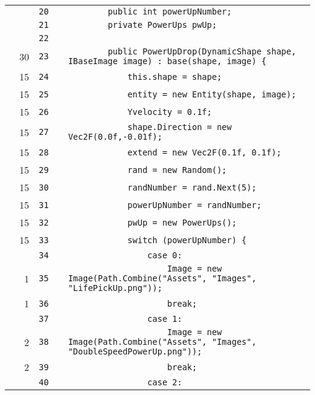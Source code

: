 \documentclass[a4paper,landscape,10pt]{article}
\begin{document}
\begin{longtable}[l]{lrrll}
\cellcolor{gray} &  & \verb~20~ & & \verb~        public int powerUpNumber;~\\
\cellcolor{gray} &  & \verb~21~ & & \verb~        private PowerUps pwUp;~\\
\cellcolor{gray} &  & \verb~22~ & & \verb~~\\
\cellcolor{green} & 30 & \verb~23~ & & \verb~        public PowerUpDrop(DynamicShape shape, IBaseImage image) : base(shape, image) {~\\
\cellcolor{green} & 15 & \verb~24~ & & \verb~            this.shape = shape;~\\
\cellcolor{green} & 15 & \verb~25~ & & \verb~            entity = new Entity(shape, image);~\\
\cellcolor{green} & 15 & \verb~26~ & & \verb~            Yvelocity = 0.1f;~\\
\cellcolor{green} & 15 & \verb~27~ & & \verb~            shape.Direction = new Vec2F(0.0f,-0.01f);~\\
\cellcolor{green} & 15 & \verb~28~ & & \verb~            extend = new Vec2F(0.1f, 0.1f);~\\
\cellcolor{green} & 15 & \verb~29~ & & \verb~            rand = new Random();~\\
\cellcolor{green} & 15 & \verb~30~ & & \verb~            randNumber = rand.Next(5);~\\
\cellcolor{green} & 15 & \verb~31~ & & \verb~            powerUpNumber = randNumber;~\\
\cellcolor{green} & 15 & \verb~32~ & & \verb~            pwUp = new PowerUps();~\\
\cellcolor{green} & 15 & \verb~33~ & & \verb~            switch (powerUpNumber) {~\\
\cellcolor{gray} &  & \verb~34~ & & \verb~                case 0:~\\
\cellcolor{green} & 1 & \verb~35~ & & \verb~                    Image = new Image(Path.Combine("Assets", "Images", "LifePickUp.png"));~\\
\cellcolor{green} & 1 & \verb~36~ & & \verb~                    break;~\\
\cellcolor{gray} &  & \verb~37~ & & \verb~                case 1:~\\
\cellcolor{green} & 2 & \verb~38~ & & \verb~                    Image = new Image(Path.Combine("Assets", "Images", "DoubleSpeedPowerUp.png"));~\\
\cellcolor{green} & 2 & \verb~39~ & & \verb~                    break;~\\
\cellcolor{gray} &  & \verb~40~ & & \verb~                case 2:~\\

\end{longtable}
\end{document}
